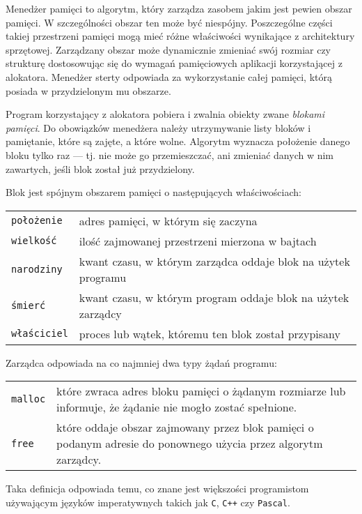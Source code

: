 \documentclass[12pt,a4paper,titlepage,twoside]{mwart}
\begin{document}
Menedżer pamięci to algorytm, który zarządza zasobem jakim jest pewien obszar
pamięci. W szczególności obszar ten może być niespójny. Poszczególne części
takiej przestrzeni pamięci mogą mieć różne właściwości wynikające z
architektury sprzętowej. Zarządzany obszar może dynamicznie zmieniać swój
rozmiar czy strukturę dostosowując się do wymagań pamięciowych aplikacji
korzystającej z alokatora. Menedżer sterty odpowiada za wykorzystanie całej
pamięci, którą posiada w przydzielonym mu obszarze.

Program korzystający z alokatora pobiera i zwalnia obiekty zwane
\textit{blokami pamięci}. Do obowiązków menedżera należy utrzymywanie listy
bloków i pamiętanie, które są zajęte, a które wolne. Algorytm wyznacza
położenie danego bloku tylko raz --- tj. nie może go przemieszczać, ani zmieniać
danych w nim zawartych, jeśli blok został już przydzielony.

Blok jest spójnym obszarem pamięci o następujących właściwościach:

\begin{tabularx}{\textwidth}{@{\hspace{4ex}}lX@{}}
	\texttt{położenie}	& adres pamięci, w którym się zaczyna \\
	\texttt{wielkość}	& ilość zajmowanej przestrzeni mierzona w bajtach \\
	\texttt{narodziny}	& kwant czasu, w którym zarządca oddaje blok na użytek programu \\
	\texttt{śmierć}		& kwant czasu, w którym program oddaje blok na użytek zarządcy \\
	\texttt{właściciel}	& proces lub wątek, któremu ten blok został przypisany \\
\end{tabularx}

Zarządca odpowiada na co najmniej dwa typy żądań programu:

\begin{tabularx}{\textwidth}{@{\hspace{4ex}}lX@{}}
	\texttt{malloc} & które zwraca adres bloku pamięci o żądanym
	rozmiarze lub informuje, że żądanie nie mogło zostać spełnione. \\

	\texttt{free} & które oddaje obszar zajmowany przez blok pamięci o
	podanym adresie do ponownego użycia przez algorytm zarządcy. \\
\end{tabularx}

Taka definicja odpowiada temu, co znane jest większości programistom
używającym języków imperatywnych takich jak \verb#C#, \verb#C++# czy
\verb#Pascal#.
\end{document}
